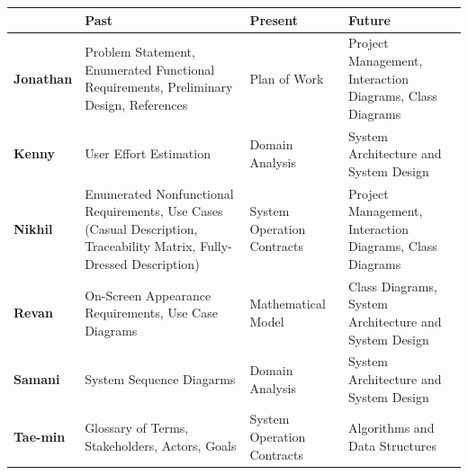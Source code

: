 \documentclass[letterpaper,english, 12pt]{scrreprt}
\begin{document}
\begin{center}
        \begin{tabular}{|C{2cm}|C{6cm}|C{3cm}|C{3cm}|}
                \hline
                         & \textbf{Past} & \textbf{Presen}t & \textbf{Future}  \\
                \hline
                        \textbf{Jonathan} & Problem Statement, Enumerated Functional Requirements, Preliminary Design, References & Plan of Work & Project Management, Interaction Diagrams, Class Diagrams \\
                \hline
                        \textbf{Kenny} & User Effort Estimation & Domain Analysis & System Architecture and System Design \\
                \hline
                        \textbf{Nikhil} & Enumerated Nonfunctional Requirements, Use Cases (Casual Description, Traceability Matrix, Fully-Dressed Description) & System Operation Contracts & Project Management, Interaction Diagrams, Class Diagrams  \\
                \hline
                        \textbf{Revan} & On-Screen Appearance Requirements, Use Case Diagrams & Mathematical Model & Class Diagrams, System Architecture and System Design \\
                \hline
                        \textbf{Samani} & System Sequence Diagarms & Domain Analysis & System Architecture and System Design \\
                \hline
                        \textbf{Tae-min} & Glossary of Terms, Stakeholders, Actors, Goals & System Operation Contracts & Algorithms and Data Structures \\
                \hline   
                       
        \end{tabular}
\end{center}
\end{document}
